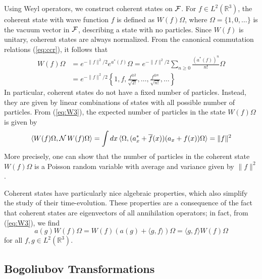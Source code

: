 \documentclass[11pt,a4paper]{article}
\newcommand{\bR}{{\mathbb R}}
\newcommand{\cF}{{\cal F}}
\newcommand{\cN}{{\cal N}}
\begin{document}
Using Weyl operators, we construct coherent states on $\cF$. For $f \in L^2 (\bR^3)$, the coherent state with wave function $f$ is defined as $W(f) \Omega$, where $\Omega = \{ 1, 0, \dots \}$ is the vacuum vector in $\cF$, describing a state with no particles. Since $W(f)$ is unitary, coherent states are always normalized. {F}rom the canonical commutation relations (\ref{eq:ccr}), it follows that  
\[ \begin{split} 
W(f) \Omega &= e^{-\| f \|^2 /2} e^{a^* (f)} \Omega = e^{-\| f\|^2/2} \sum_{n \geq 0} \frac{(a^* (f))^n}{n!} \Omega \\ &= e^{-\| f\|^2/2} \left\{ 1 , f , \frac{f^{\otimes 2}}{\sqrt{2!}} , \dots , \frac{f^{\otimes n}}{\sqrt{n!}} , \dots \right\} \end{split} \]
In particular, coherent states do not have a fixed number of particles. Instead, they are given by linear combinations of states with all possible number of particles. {F}rom (\ref{eq:W3}), the expected 
number of particles in the state $W(f) \Omega$ is given by
\[ \langle W(f) \Omega, \cN \, W(f) \Omega \rangle = \int dx \, \langle \Omega, (a_x^* + \overline{f} (x)) (a_x + f(x)) \Omega \rangle = \| f \|^2 \]
More precisely, one can show that the number of particles in the coherent state $W(f) \Omega$ is a Poisson random variable with average and variance given by $\| f \|^2$. 

\medskip

Coherent states have particularly nice algebraic properties, which also simplify the study of their time-evolution. These properties are a consequence of the fact that coherent states are eigenvectors of all annihilation operators; in fact, from (\ref{eq:W3}), we find 
\[  a(g) W(f) \Omega = W(f) ( a(g) + \langle g , f \rangle ) \Omega = \langle g ,f \rangle W(f) \Omega \]
for all $f,g \in L^2 (\bR^3)$.


\subsection{Bogoliubov Transformations}
\label{sec:bt}
\end{document}
